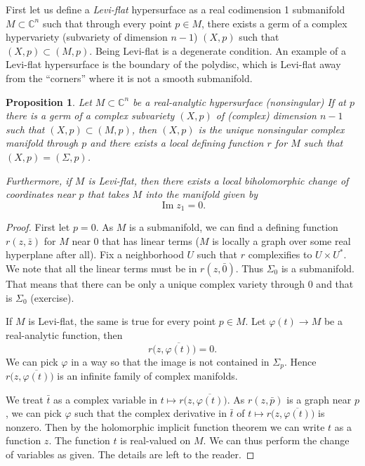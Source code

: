 \documentclass[12pt,openany]{book}
\renewcommand{\Im}{\operatorname{Im}}
\newcommand{\C}{{\mathbb{C}}}
\newcommand{\myindex}[1]{#1\index{#1}}
\theoremstyle{plain}
\newtheorem{prop}[thm]{Proposition}
\theoremstyle{remark}
\theoremstyle{definition}
\theoremstyle{exercise}
\theoremstyle{example}
\begin{document}
First let us define
a \emph{\myindex{Levi-flat}} hypersurface as a real codimension 1
submanifold $M \subset \C^n$ such that through every point $p \in M$,
there exists a germ of a
complex hypervariety (subvariety of dimension $n-1$) $(X,p)$ such that $(X,p)
\subset (M,p)$.  Being Levi-flat is a degenerate condition.
An example of a Levi-flat hypersurface is the 
boundary of the polydisc, which is Levi-flat away from the ``corners'' where it is not a
smooth submanifold.

\begin{prop}
Let $M \subset \C^n$ be a real-analytic hypersurface (nonsingular)
If at $p$ there is a germ of a complex subvariety $(X,p)$ of (complex)
dimension $n-1$ such that $(X,p) \subset (M,p)$, then $(X,p)$ is the unique
nonsingular complex manifold through $p$ and there exists a local defining
function $r$ for $M$ such that $(X,p) = (\Sigma,p)$.

Furthermore, if $M$ is Levi-flat,
then there exists a local biholomorphic change of coordinates near $p$ that takes
$M$ into the manifold given by
\begin{equation}
\Im z_1 = 0 .
\end{equation}
\end{prop}

\begin{proof}
First let $p=0$.
As $M$ is a submanifold, we can find
a defining function $r(z,\bar{z})$ for $M$ near $0$ that has linear
terms ($M$ is locally a graph over some real hyperplane after all).
Fix a
neighborhood $U$ such that $r$ complexifies to $U \times U^*$.
We note that all the linear terms must be in $r(z,\bar{0})$.  Thus
$\Sigma_0$ is a submanifold.  That means that there can be only a unique
complex variety through $0$ and that is $\Sigma_0$ (exercise).

If $M$ is Levi-flat, the same is true for every point $p \in M$.
Let $\varphi(t) \to M$ be a real-analytic function, then
\begin{equation}
r\bigl(z,\overline{\varphi(t)}\bigr) = 0 .
\end{equation}
We can pick $\varphi$ in a way so that the image is not contained in
$\Sigma_p$.  Hence $r\bigl(z,\overline{\varphi(t)}\bigr)$ is an infinite family
of complex manifolds.

We treat $\bar{t}$ as a complex variable in
$t \mapsto r\bigl(z,\overline{\varphi(t)}\bigr)$.  As 
$r(z,\bar{p})$ is a graph near $p$, we can pick $\varphi$ such that the
complex derivative in $\bar{t}$ of $t \mapsto
r\bigl(z,\overline{\varphi(t)}\bigr)$
is nonzero.  Then by the holomorphic implicit function theorem
we can write $t$ as a function $z$.  The function $t$ is real-valued
on $M$.  We can thus perform the change of variables as given.  The 
details are left to the reader.
\end{proof}
\end{document}
